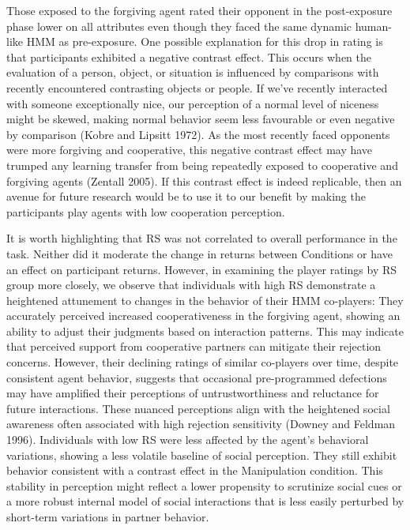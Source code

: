 \documentclass[
]{article}
\begin{document}
Those exposed to the forgiving agent rated their opponent in the post-exposure phase lower on all attributes even though they faced the same dynamic human-like HMM as pre-exposure. One possible explanation for this drop in rating is that participants exhibited a negative contrast effect. This occurs when the evaluation of a person, object, or situation is influenced by comparisons with recently encountered contrasting objects or people. If we've recently interacted with someone exceptionally nice, our perception of a normal level of niceness might be skewed, making normal behavior seem less favourable or even negative by comparison (Kobre and Lipsitt 1972). As the most recently faced opponents were more forgiving and cooperative, this negative contrast effect may have trumped any learning transfer from being repeatedly exposed to cooperative and forgiving agents (Zentall 2005). If this contrast effect is indeed replicable, then an avenue for future research would be to use it to our benefit by making the participants play agents with low cooperation perception.

It is worth highlighting that RS was not correlated to overall performance in the task. Neither did it moderate the change in returns between Conditions or have an effect on participant returns. However, in examining the player ratings by RS group more closely, we observe that individuals with high RS demonstrate a heightened attunement to changes in the behavior of their HMM co-players: They accurately perceived increased cooperativeness in the forgiving agent, showing an ability to adjust their judgments based on interaction patterns. This may indicate that perceived support from cooperative partners can mitigate their rejection concerns. However, their declining ratings of similar co-players over time, despite consistent agent behavior, suggests that occasional pre-programmed defections may have amplified their perceptions of untrustworthiness and reluctance for future interactions. These nuanced perceptions align with the heightened social awareness often associated with high rejection sensitivity (Downey and Feldman 1996). Individuals with low RS were less affected by the agent's behavioral variations, showing a less volatile baseline of social perception. They still exhibit behavior consistent with a contrast effect in the Manipulation condition. This stability in perception might reflect a lower propensity to scrutinize social cues or a more robust internal model of social interactions that is less easily perturbed by short-term variations in partner behavior.
\end{document}
